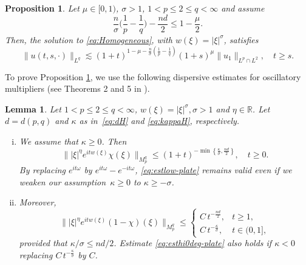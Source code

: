 \documentclass[10pt]{article}
\newtheorem{proposition}{Proposition}[section]
\newtheorem{lemma}{Lemma}[section]
\newcommand{\<}{\langle}
\renewcommand{\>}{\rangle}
\numberwithin{equation}{section}
\begin{document}
\begin{proposition}\label{Prop1H}
Let $\mu\in [0,1)$,  $\sigma>1$, $1< p\leq 2\leq q <\infty$ and assume
\begin{equation}\label{regularity}
\frac{n}{\sigma}\Big( \frac1p-\frac1q \Big)- \frac{nd}{2} \leq 1-\frac{\mu}{2}.
\end{equation}
Then, the solution to \eqref{eq:Homogeneous}, with $w(\xi)=|\xi|^{\sigma}$, satisfies
\begin{equation*}
\|u(t, s, \cdot)\|_{L^q} \lesssim  (1+t)^{1-\mu-\frac{n}{\sigma}\left(\frac1p-\frac1q\right)} (1+s)^{\mu} \|u_1\|_{L^p\cap L^2}, \quad t\geq s.
\end{equation*}
\end{proposition}
To prove Proposition \ref{Prop1H}, we use the following dispersive estimates for oscillatory multipliers (see Theorems 2 and 5 in \cite{DEL=2026}).
\begin{lemma} \label{Lemma-DELH}
Let $1< p\leq 2\leq q<\infty$, $w(\xi)=|\xi|^{\sigma}, \sigma>1$ and $\eta\in \mathbb{R}$. Let $d=d(p,q)$ and $\kappa$ as in~\eqref{eq:dH} and \eqref{eq:kappaH}, respectively.
\begin{enumerate}[(i)]
\item We assume that $\kappa \geq0$. Then
\begin{equation} \label{eq:estlow-plate}
\| |\xi|^{\eta}e^{itw(\xi)}\chi(\xi) \|_{M_p^q} \leq (1+t)^{-\min\left\{ \frac{\kappa}{\sigma}, \frac{nd}2  \right\}}, \quad t\geq 0.
\end{equation}
By replacing $e^{it\omega}$ by $e^{it\omega}-e^{-it\omega}$, \eqref{eq:estlow-plate} remains valid even if we weaken our assumption~$\kappa\geq0$ to $\kappa\geq -\sigma$.
\item Moreover,
\begin{equation}\label{eq:esthi0deg-plate}
\| |\xi|^{\eta}e^{itw(\xi)}(1-\chi)(\xi) \|_{M_p^q} \leq \begin{cases}
C\,t^{-\frac{nd}2}, & t\geq1, \\
C\,t^{-\frac{\kappa}{\sigma}},& t\in(0,1],
\end{cases}
\end{equation}
provided that $\kappa/\sigma\leq nd/2$. Estimate \eqref{eq:esthi0deg-plate} also holds if $\kappa<0$ replacing $C\,t^{-\frac{\kappa}{\sigma}}$ by $C$.
\end{enumerate}
\end{lemma}
\end{document}
